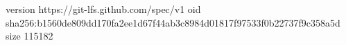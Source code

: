 version https://git-lfs.github.com/spec/v1
oid sha256:b1560de809dd170fa2ee1d67f44ab3c8984d01817f97533f0b22737f9c358a5d
size 115182
